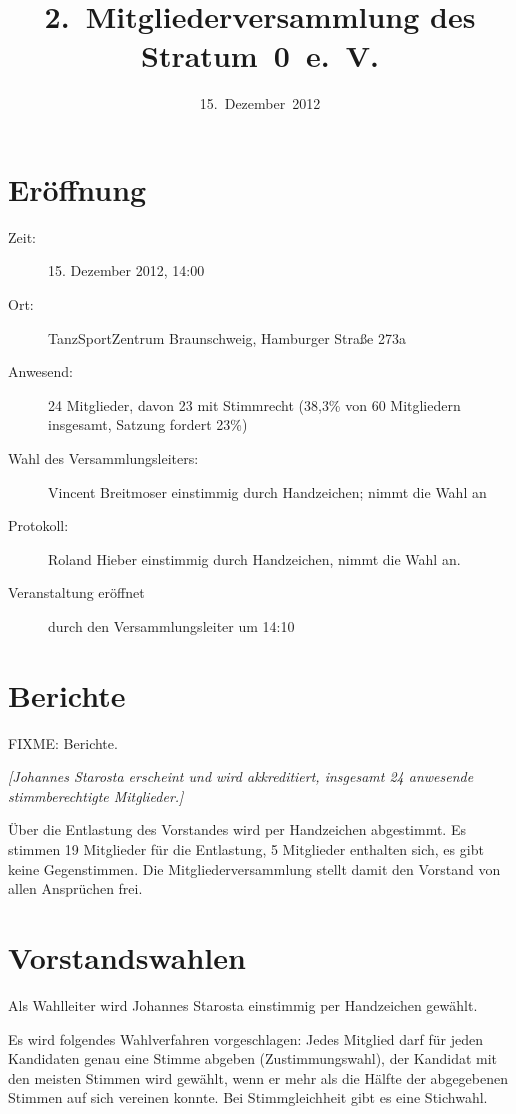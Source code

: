 \documentclass[a4paper,12pt]{scrartcl}
\title{2.~Mitgliederversammlung des Stratum~0~e.~V.}
\date{15.~Dezember~2012}
\begin{document}
\maketitle
\def\@sndsectionmark{TOP}
\tableofcontents

\section{Eröffnung}
\begin{description}
  \item[Zeit:] 15. Dezember 2012, 14:00
  \item[Ort:] TanzSportZentrum Braunschweig, Hamburger Straße 273a
  \item[Anwesend:] 24 Mitglieder, davon 23 mit Stimmrecht (38{,}3\% von 60
    Mitgliedern insgesamt, Satzung fordert 23\%)
  \item[Wahl des Versammlungsleiters:] Vincent Breitmoser einstimmig durch
    Handzeichen; nimmt die Wahl an
  \item[Protokoll:] Roland Hieber einstimmig durch Handzeichen, nimmt die Wahl
    an.
  \item[Veranstaltung eröffnet] durch den Versammlungsleiter um 14:10
\end{description}

\section{Berichte}
FIXME: Berichte.

\emph{[Johannes Starosta erscheint und wird akkreditiert, insgesamt 24 anwesende
stimmberechtigte Mitglieder.]}

Über die Entlastung des Vorstandes wird per Handzeichen abgestimmt. Es stimmen
19 Mitglieder für die Entlastung, 5 Mitglieder enthalten sich, es gibt keine
Gegenstimmen. Die Mitgliederversammlung stellt damit den Vorstand von allen
Ansprüchen frei.

\section{Vorstandswahlen}
Als Wahlleiter wird Johannes Starosta einstimmig per Handzeichen gewählt.

Es wird folgendes Wahlverfahren vorgeschlagen: Jedes Mitglied darf für jeden
Kandidaten genau eine Stimme abgeben (Zustimmungswahl), der Kandidat mit den
meisten Stimmen wird gewählt, wenn er mehr als die Hälfte der abgegebenen
Stimmen auf sich vereinen konnte. Bei Stimmgleichheit gibt es eine Stichwahl.
\end{document}
